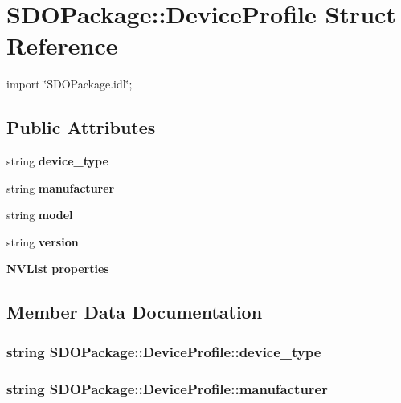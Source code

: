 \section{SDOPackage::DeviceProfile Struct Reference}
\label{structSDOPackage_1_1DeviceProfile}


{\ttfamily import \char`\"{}SDOPackage.idl\char`\"{};}

\subsection*{Public Attributes}
\begin{DoxyCompactItemize}
\item 
string {\bf device\_\-type}
\item 
string {\bf manufacturer}
\item 
string {\bf model}
\item 
string {\bf version}
\item 
{\bf NVList} {\bf properties}
\end{DoxyCompactItemize}


\subsection{Member Data Documentation}
\subsubsection[{device\_\-type}]{\setlength{\rightskip}{0pt plus 5cm}string {\bf SDOPackage::DeviceProfile::device\_\-type}}\label{structSDOPackage_1_1DeviceProfile_a41856ed05da8e78d4e853c44fb82a0f0}
\subsubsection[{manufacturer}]{\setlength{\rightskip}{0pt plus 5cm}string {\bf SDOPackage::DeviceProfile::manufacturer}}\label{structSDOPackage_1_1DeviceProfile_a7f04867de10ac0a3f2dba9d1e672e94c}
